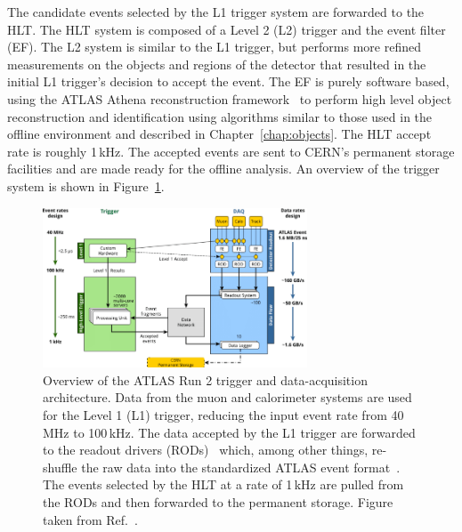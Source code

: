 The candidate events selected by the L1 trigger system are forwarded to the HLT.
The HLT system is composed of a Level 2 (L2) trigger and the event filter (EF).
The L2 system is similar to the L1 trigger, but performs more refined measurements on the objects and
regions of the detector that resulted in the initial L1 trigger's decision to accept the event.
The EF is purely software based, using the ATLAS Athena reconstruction framework~\cite{AthenaRef}
to perform high level object reconstruction and identification using algorithms similar to those used
in the offline environment and described in Chapter~\ref{chap:objects}.
The HLT accept rate is roughly 1\,kHz.
The accepted events are sent to CERN's permanent storage facilities and are made ready for the offline analysis.
An overview of the trigger system is shown in Figure~\ref{fig:run2_trigger}.


\begin{figure}[!htb]
    \begin{center}
        \includegraphics[width=0.7\textwidth]{figures/chapter2/tdaq/atlas_run2_trigger_system}
        \caption{
            Overview of the ATLAS Run 2 trigger and data-acquisition architecture.
            Data from the muon and calorimeter systems are used for the Level 1 (L1) trigger, reducing
            the input event rate from 40\,MHz to 100\,kHz.
            The data accepted by the L1 trigger are forwarded to the readout drivers (RODs)~\cite{Jenni:616089}
            which, among other things, re-shuffle the raw data into the standardized ATLAS event format~\cite{Bee:683741}.
            The events selected by the HLT at a rate of 1\,kHz are pulled from the RODs and then forwarded to the permanent
            storage.
            Figure taken from Ref.~\cite{PanduroVazquez:2244345}.
        }
        \label{fig:run2_trigger}
    \end{center}
\end{figure}
